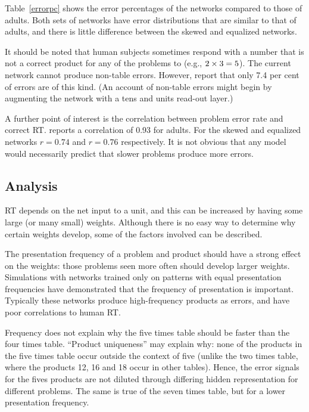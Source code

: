 Table~\ref{errorpc} shows the error
percentages of the networks compared to those of adults.  Both sets of
networks have error distributions that are similar to that of adults, and
there is little difference between the skewed and equalized
networks.

It should be noted that human subjects sometimes respond with a number that
is not a correct product for any of the problems  to  (e.g.,
$\mbox{$2\times3$}=5$). The current network cannot produce non-table errors. However,
 report that only 7.4 per cent of errors are of this kind.
(An account of non-table errors might begin by augmenting the network with
a tens and units read-out layer.)

A further point of interest is the correlation between problem error rate
and correct RT.  reports a correlation of 0.93 for
adults.  For the skewed and equalized networks $r=0.74$
and $r=0.76$ respectively.  It is not obvious that any model
would necessarily predict that slower problems produce more errors.




\subsection*{Analysis}

RT depends on
the net input to a unit, and this can be increased by having some large (or
many small) weights.  Although there is no easy way to determine why
certain weights develop, some of the factors involved can be
described.

The presentation frequency of a problem and product should have a strong
effect on the weights: those problems seen more often should develop
larger weights. Simulations with networks trained only on patterns with
equal presentation frequencies have demonstrated that the frequency of
presentation is important. Typically these networks produce
high-frequency products as errors, and have poor correlations to human RT.

Frequency does not explain why the five times table should be faster than
the four times table. ``Product uniqueness'' may explain why:
none of the products in the five times table occur outside the
context of five (unlike the two times table, where the products 12,
16 and 18 occur in other tables).  Hence, the error signals for the
fives products are not diluted through differing hidden
representation for different problems.  The same is true of the seven
times table, but for a lower presentation frequency.

